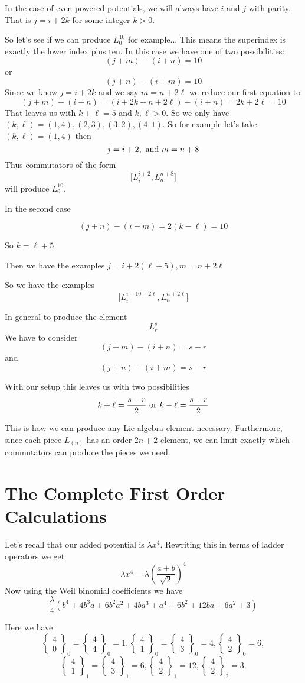 \documentclass{article}
\newcommand{\lrbrack}[2]{\lbrack #1 , #2 \rbrack}
\newcommand{\wbc}[3]{\left\{\begin{array}{cc}
		{#1}\\{#2}
	\end{array} \right\}_{#3}}
\begin{document}
In the case of even powered potentials, we will always have $i$ and $j$ with parity.  That is $j = i + 2k$ for some integer $k>0$.

So let's see if we can produce $L_0^{10}$ for example...
This means the superindex is exactly the lower index plus ten.  In this case we have one of two possibilities:
\[
(j+m)-(i+n) = 10
\]
or
\[
(j+n)-(i+m) = 10
\]
Since we know $j=i+2k$ and we say $m= n+2\ell$ we reduce our first equation to
\[
(j+m)-(i+n) = (i+2k + n+2\ell) - (i+n) = 2k + 2\ell = 10
\]
That leaves us with $k+\ell = 5$ and $k,\ell>0$.  So we only have $(k,\ell) = (1,4),(2,3),(3,2),(4,1)$.
So for example let's take $(k,\ell) = (1,4)$ then
\[
j = i+2, \textnormal{ and } m = n+ 8
\]
Thus commutators of the form
\[
\lrbrack{L_i^{i+2}}{L_n^{n+8}} 
\]
will produce $L_0^{10}$.

In the second case

\[
(j+n) - (i+m) = 2(k-\ell) = 10
\]

So $k = \ell + 5$

Then we have the examples $ j = i + 2(\ell + 5), m = n+ 2\ell$

So we have the examples
\[
\lrbrack{L_{i}^{i+10 + 2\ell}}{L_n^{n+2\ell}}
\]



In general to produce the element
\[
L_{r}^{s}
\]
We have to consider
\[
(j+m)-(i+n) = s-r
\]
and
\[
(j+n)-(i+m) = s-r
\]

With our setup this leaves us with two possibilities
\[
k+\ell = \frac{s-r}{2} \textnormal{ or } k-\ell = \frac{s-r}{2}
\]

This is how we can produce any Lie algebra element necessary.  Furthermore, since each piece $L_{(n)}$ has an order $2n+2$ element, we can limit exactly which commutators can produce the pieces we need.



\section*{The Complete First Order Calculations}

Let's recall that our added potential is $\lambda x^4$.  Rewriting this in terms of ladder operators we get
\[
\lambda x^4 = \lambda \left(\frac{a+b}{\sqrt{2}}\right)^4
\]
Now using the Weil binomial coefficients we have
\[
\frac{\lambda}{4}(b^4 + 4b^3 a + 6 b^2 a^2 + 4 b a^3 + a^4 + 6 b^2 + 12 ba + 6 a^2 + 3)
\]

Here we have
\[
\wbc{4}{0}{0} =\wbc{4}{4}{0}= 1, \wbc{4}{1}{0} = \wbc{4}{3}{0} = 4, \wbc{4}{2}{0} = 6,
\]
\[
\wbc{4}{1}{1} = \wbc{4}{3}{1} = 6, \wbc{4}{2}{1} = 12, \wbc{4}{2}{2} = 3.
\]
\end{document}
